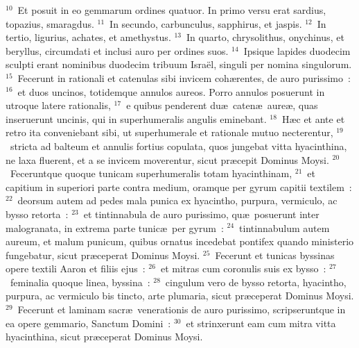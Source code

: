 ${}^{10}$~Et posuit in eo gemmarum ordines quatuor. In primo versu erat sardius, topazius, smaragdus.
${}^{11}$~In secundo, carbunculus, sapphirus, et jaspis.
${}^{12}$~In tertio, ligurius, achates, et amethystus.
${}^{13}$~In quarto, chrysolithus, onychinus, et beryllus, circumdati et inclusi auro per ordines suos.
${}^{14}$~Ipsique lapides duodecim sculpti erant nominibus duodecim tribuum Isra\"el, singuli per nomina singulorum.
${}^{15}$~Fecerunt in rationali et catenulas sibi invicem coh\ae rentes, de auro purissimo~:
${}^{16}$~et duos uncinos, totidemque annulos aureos. Porro annulos posuerunt in utroque latere rationalis,
${}^{17}$~e quibus penderent du\ae\ caten\ae\ aure\ae , quas inseruerunt uncinis, qui in superhumeralis angulis eminebant.
${}^{18}$~H\ae c et ante et retro ita conveniebant sibi, ut superhumerale et rationale mutuo necterentur,
${}^{19}$~stricta ad balteum et annulis fortius copulata, quos jungebat vitta hyacinthina, ne laxa fluerent, et a se invicem moverentur, sicut pr\ae cepit Dominus Moysi.
${}^{20}$~Feceruntque quoque tunicam superhumeralis totam hyacinthinam,
${}^{21}$~et capitium in superiori parte contra medium, oramque per gyrum capitii textilem~:
${}^{22}$~deorsum autem ad pedes mala punica ex hyacintho, purpura, vermiculo, ac bysso retorta~:
${}^{23}$~et tintinnabula de auro purissimo, qu\ae\ posuerunt inter malogranata, in extrema parte tunic\ae\ per gyrum~:
${}^{24}$~tintinnabulum autem aureum, et malum punicum, quibus ornatus incedebat pontifex quando ministerio fungebatur, sicut pr\ae ceperat Dominus Moysi.
${}^{25}$~Fecerunt et tunicas byssinas opere textili Aaron et filiis ejus~:
${}^{26}$~et mitras cum coronulis suis ex bysso~:
${}^{27}$~feminalia quoque linea, byssina~:
${}^{28}$~cingulum vero de bysso retorta, hyacintho, purpura, ac vermiculo bis tincto, arte plumaria, sicut pr\ae ceperat Dominus Moysi.
${}^{29}$~Fecerunt et laminam sacr\ae\ venerationis de auro purissimo, scripseruntque in ea opere gemmario, Sanctum Domini~:
${}^{30}$~et strinxerunt eam cum mitra vitta hyacinthina, sicut pr\ae ceperat Dominus Moysi.


